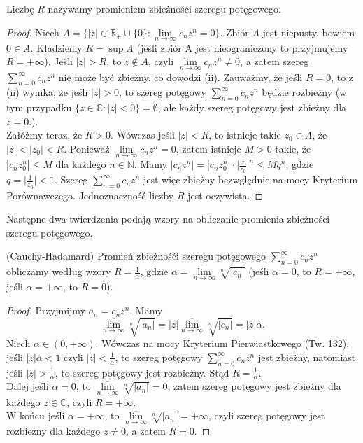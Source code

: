 \documentclass[leqno]{article}
\begin{document}
\begin{justify}
Liczbę $R$ nazywamy promieniem zbieżnośći szeregu potęgowego.

\begin{proof}
    Niech $A = \Big\{ |z| \in \mathbb{R}_+ \cup \{0\} : \lim\limits_{n \to \infty}c_n z^n = 0 \Big\}$. Zbiór $A$ jest niepusty, bowiem
    $0 \in A$. Kładziemy $R = \sup A$ (jeśli zbiór A jest nieograniczony to przyjmujemy $R = + \infty$). 
    Jeśli $|z| > R$, to $z \notin A$, czyli $\lim\limits_{n \to \infty}c_n z^n \neq 0$, a zatem szereg $\sum\limits_{n = 0}^{\infty} c_n z^n$ nie może być
    zbieżny, co dowodzi (ii). Zauważmy, że jeśli $R = 0$, to z (ii) wynika, że jeśli $|z| > 0$, to szereg potęgowy $\sum\limits_{n = 0}^{\infty} c_n z^n$ 
    będzie rozbieżny (w tym przypadku $\{z \in \mathbb{C} : |z| < 0\} = \emptyset $, ale każdy szereg potęgowy jest zbieżny dla $z = 0$.). \\
    Załóżmy teraz, że $R > 0$. Wówczas jeśli $|z| < R$, to istnieje takie $z_0 \in A$, że $|z| < |z_0| < R$.
    Ponieważ $\lim\limits_{n \to \infty}c_n z^n = 0$, zatem istnieje $M > 0$ takie, że $|c_n z_0^n| \leqslant M$ dla każdego $n \in \mathbb{N}$.
    Mamy $|c_n z^n| = |c_n z_0^n| \cdot {\big|\frac{z}{z_0}\big|}^n \leqslant M q^n$, gdzie $q = \big|\frac{1}{z_0}\big| < 1$. 
    Szereg $\sum\limits_{n = 0}^{\infty} c_n z^n$ jest więc zbieżny bezwględnie na mocy Kryterium Porównawczego. Jednoznaczność liczby $R$ jest oczywista.
\end{proof}

Następne dwa twierdzenia podają wzory na obliczanie promienia zbieżności szeregu potęgowego.

\begin{theorem}
{
    (Cauchy-Hadamard) Promień zbieżnośći szeregu potęgowego $\sum\limits_{n=0}^{\infty}c_n z^n$ obliczamy według wzory $R = \frac{1}{\alpha}$, gdzie
    $\alpha = \overline{\lim\limits_{n \to \infty}}\sqrt[n]{|c_n|}$ (jeśli $\alpha = 0$, to $R = +\infty$, jeśli $\alpha = +\infty$, to $R = 0$).
}
\end{theorem}

\begin{proof}
    Przyjmijmy $a_n = c_n z^n$, Mamy 
    \[
        \overline{\lim\limits_{n \to \infty}}\sqrt[n]{|a_n|} = |z| \overline{\lim\limits_{n \to \infty}}\sqrt[n]{|c_n|} = |z|\alpha.
    \]
    Niech $\alpha \in (0, +\infty)$. Wówczas na mocy Kryterium Pierwiastkowego (Tw. 132), jeśli $|z|\alpha < 1$ czyli $|z| < \frac{1}{\alpha}$, to szereg potęgowy
    $\sum\limits_{n=0}^{\infty}c_n z^n$ jest zbieżny, natomiast jeśli $|z| > \frac{1}{\alpha}$, to szereg potęgowy jest rozbieżny. Stąd $R = \frac{1}{\alpha}$. \\
    Dalej jeśli $\alpha = 0$, to $\overline{\lim\limits_{n \to \infty}}\sqrt[n]{|a_n|} = 0$, zatem szereg potęgowy jest zbieżny dla każdego $z \in \mathbb{C}$, czyli $R = +\infty$. \\
    W końcu jeśli $\alpha = + \infty$, to $\overline{\lim\limits_{n \to \infty}}\sqrt[n]{|a_n|} = + \infty$, czyli szereg potęgowy jest rozbieżny dla 
    każdego $z \neq 0$, a zatem $R = 0$.
\end{proof}


\end{justify}
\end{document}
